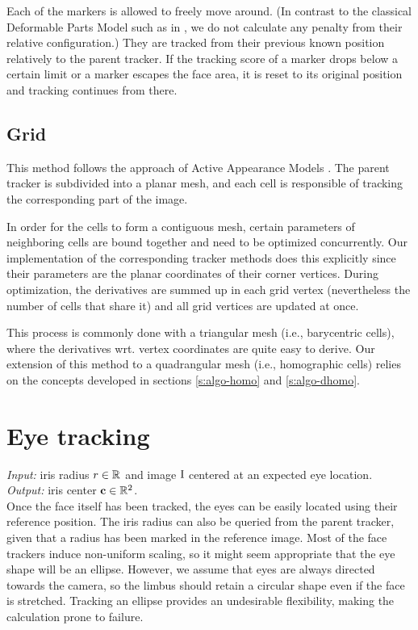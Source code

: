 Each of the markers is allowed to freely move around.
(In contrast to the classical Deformable Parts Model such as in \cite{uricar12}, we do not calculate any penalty from their relative configuration.)
They are tracked from their previous known position relatively to the parent tracker.
If the tracking score of a marker drops below a certain limit or a marker escapes the face area, it is reset to its original position and tracking continues from there.

\subsection{Grid}

This method follows the approach of Active Appearance Models \cite{cootes01}.
The parent tracker is subdivided into a planar mesh, and each cell is responsible of tracking the corresponding part of the image.

In order for the cells to form a contiguous mesh, certain parameters of neighboring cells are bound together and need to be optimized concurrently.
Our implementation of the corresponding tracker methods does this explicitly since their parameters are the planar coordinates of their corner vertices.
During optimization, the derivatives are summed up in each grid vertex (nevertheless the number of cells that share it) and all grid vertices are updated at once.

This process is commonly done with a triangular mesh (i.e., barycentric cells), where the derivatives wrt. vertex coordinates are quite easy to derive.
Our extension of this method to a quadrangular mesh (i.e., homographic cells) relies on the concepts developed in sections \ref{s:algo-homo} and \ref{s:algo-dhomo}.

\section{Eye tracking}

\textit{Input:} iris radius $r \in \mathbb{R}$ and image $\mathrm{I}$ centered at an expected eye location.\\
\textit{Output:} iris center $\mathbf{c} \in \mathbb{R}^2$.\\

Once the face itself has been tracked, the eyes can be easily located using their reference position.
The iris radius can also be queried from the parent tracker, given that a radius has been marked in the reference image.
Most of the face trackers induce non-uniform scaling, so it might seem appropriate that the eye shape will be an ellipse.
However, we assume that eyes are always directed towards the camera, so the limbus should retain a circular shape even if the face is stretched.
Tracking an ellipse provides an undesirable flexibility, making the calculation prone to failure.

